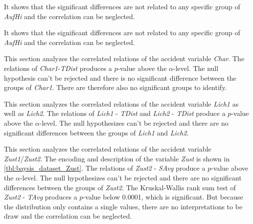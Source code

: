 It shows that the significant differences are not related to any specific group of \textit{AufHi} and the correlation can be neglected.

It shows that the significant differences are not related to any specific group of \textit{AufHi} and the correlation can be neglected.

This section analyzes the correlated relations of the accident variable \textit{Char}. The relations of \textit{Char1}-\textit{TDist} produces a $p$-value above the $\alpha$-level. The null hypothesis can't be rejected and there is no significant difference between the groups of \textit{Char1}. There are therefore also no significant groups to identify.

This section analyzes the correlated relations of the accident variable \textit{Lich1} as well as \textit{Lich2}. The relations of \textit{Lich1} - \textit{TDist} and \textit{Lich2} - \textit{TDist} produce a $p$-value above the $\alpha$-level. The null hypothesizes can't be rejected and there are no significant differences between the groups of \textit{Lich1} and \textit{Lich2}.

This section analyzes the correlated relations of the accident variable \textit{Zust1}/\textit{Zust2}. The encoding and description of the variable \textit{Zust} is shown in \cref{tbl:baysis_dataset_Zust}. The relations of \textit{Zust2} - \textit{SAvg} produce a $p$-value above the $\alpha$-level. The null hypothesizes can't be rejected and there are no significant differences between the groups of \textit{Zust2}. The Kruskal-Wallis rank sum test of \textit{Zust2} - \textit{TAvg} produces a $p$-value below 0.0001, which is significant. But because the distribution only contains a single values, there are no interpretations to be draw and the correlation can be neglected.

